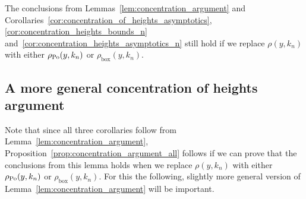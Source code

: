 \begin{proposition}\label{prop:concentration_argument_all}
The conclusions from Lemmas~\ref{lem:concentration_argument} and Corollaries~\ref{cor:concentration_of_heights_asymptotics}, \ref{cor:concentration_heights_bounds_n} and~\ref{cor:concentration_heights_asymptotics_n} still hold if we replace $\rho(y,k_n)$ with either $\rho_{{\mathrm{Po}}}(y,k_n)$ or $\rho_{\text{box}}(y,k_n)$.
\end{proposition}

\subsection{A more general concentration of heights argument}\label{ssec:general_concentration_lemma}

Note that since all three corollaries follow from Lemma~\ref{lem:concentration_argument}, Proposition~\ref{prop:concentration_argument_all} follows if we can prove that the conclusions from this lemma holds when we replace $\rho(y,k_n)$ with either $\rho_{{\mathrm{Po}}}(y,k_n)$ or $\rho_{\text{box}}(y,k_n)$. For this the following, slightly more general version of Lemma~\ref{lem:concentration_argument} will be important.

